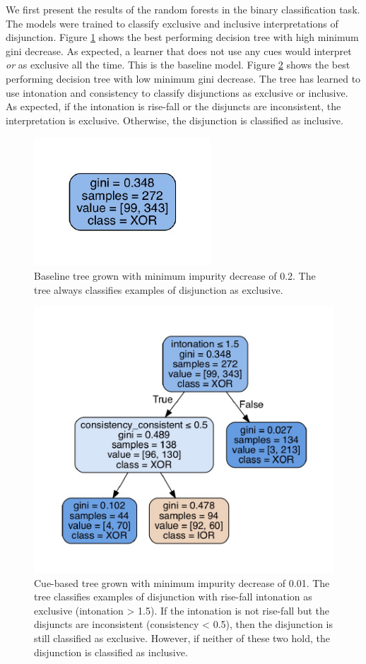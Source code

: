\documentclass[floatsintext,man]{apa6}
\theoremstyle{definition}
\theoremstyle{definition}
\theoremstyle{definition}
\theoremstyle{remark}
\begin{document}
We first present the results of the random forests in the binary
classification task. The models were trained to classify exclusive and
inclusive interpretations of disjunction. Figure
\ref{fig:binaryBaseline} shows the best performing decision tree with
high minimum gini decrease. As expected, a learner that does not use any
cues would interpret \emph{or} as exclusive all the time. This is the
baseline model. Figure \ref{fig:binaryCueBased} shows the best
performing decision tree with low minimum gini decrease. The tree has
learned to use intonation and consistency to classify disjunctions as
exclusive or inclusive. As expected, if the intonation is rise-fall or
the disjuncts are inconsistent, the interpretation is exclusive.
Otherwise, the disjunction is classified as inclusive.

\begin{figure}
\centering
\includegraphics{figs/binaryBaseline-1.pdf}
\caption{\label{fig:binaryBaseline}Baseline tree grown with minimum impurity
decrease of 0.2. The tree always classifies examples of disjunction as
exclusive.}
\end{figure}

\begin{figure}
\centering
\includegraphics{figs/binaryCueBased-1.pdf}
\caption{\label{fig:binaryCueBased}Cue-based tree grown with minimum
impurity decrease of 0.01. The tree classifies examples of disjunction
with rise-fall intonation as exclusive (intonation \textgreater{} 1.5).
If the intonation is not rise-fall but the disjuncts are inconsistent
(consistency \textless{} 0.5), then the disjunction is still classified
as exclusive. However, if neither of these two hold, the disjunction is
classified as inclusive.}
\end{figure}
\end{document}
